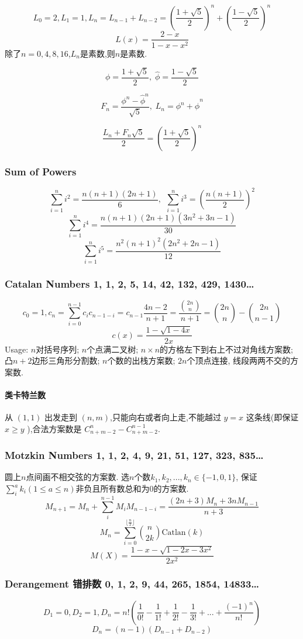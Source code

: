 \begin{small}
\[ L_0=2,L_1=1,L_n=L_{n-1}+L_{n-2}=(\frac{1+\sqrt{5}}{2})^n+(\frac{1-\sqrt{5}}{2})^n \]
\[ L(x)=\frac{2-x}{1-x-x^2} \]
除了$n=0,4,8,16$,$L_n$是素数,则$n$是素数.

$$\phi = \frac {1 + \sqrt 5} 2, \; \hat\phi = \frac {1 - \sqrt 5} 2$$

$$F_n = \frac {\phi^n - {\hat\phi} ^ n} {\sqrt 5}, \; L_n = \phi ^ n + {\hat\phi} ^ n$$

$$\frac {L_n + F_n \sqrt 5} 2 = \left( \frac {1 + \sqrt 5} 2 \right) ^ n$$

\subsubsection{Sum of Powers}
\[\sum_{i=1}^ni^2=\frac{n(n+1)(2n+1)}{6},\ \ \sum_{i=1}^ni^3=\left(\frac{n(n+1)}{2}\right)^2\]
\[\sum_{i=1}^ni^4=\frac{n(n+1)(2n+1)(3n^2+3n-1)}{30}\]
\[\sum_{i=1}^ni^5=\frac{n^2(n+1)^2(2n^2+2n-1)}{12}\]

\subsubsection{Catalan Numbers 1, 1, 2, 5, 14, 42, 132, 429, 1430\dots}
\[c_{0}=1,c_n=\sum_{i=0}^{n-1}c_ic_{n-1-i}=c_{n-1}\frac{4n-2}{n+1}=\frac{\binom{2n}{n}}{n+1}=\binom{2n}{n}-\binom{2n}{n-1}\]
\[ c(x)=\frac{1-\sqrt{1-4x}}{2x}\]
Usage: $n$对括号序列; $n$个点满二叉树; $n\times n$的方格左下到右上不过对角线方案数; 凸$n+2$边形三角形分割数; $n$个数的出栈方案数; $2n$个顶点连接, 线段两两不交的方案数.
\paragraph*{类卡特兰数}
从 $(1,1)$ 出发走到 $(n,m)$,只能向右或者向上走,不能越过 $y=x$ 这条线(即保证 $x\geq y$ ),合法方案数是 $C_{n+m-2}^{n} - C_{n+m-2}^{n-1}$.
\subsubsection{Motzkin Numbers 1, 1, 2, 4, 9, 21, 51, 127, 323, 835\dots}
圆上$n$点间画不相交弦的方案数. 选$n$个数$k_1,k_2,...,k_n\in\{-1,0,1\}$, 保证$\sum_i^ak_i(1\leq a\leq n)$非负且所有数总和为$0$的方案数. \[M_{n+1}=M_n+\sum_i^{n-1}M_iM_{n-1-i}=\frac{(2n+3)M_n+3nM_{n-1}}{n+3}\]
\[M_n=\sum_{i=0}^{\lfloor \frac{n}{2}\rfloor}\binom{n}{2k} \mathrm{Catlan}(k)\]
\[M(X)=\frac{1-x-\sqrt{1-2x-3x^2}}{2x^2}\]
\subsubsection{Derangement 错排数 0, 1, 2, 9, 44, 265, 1854, 14833\dots}
\[D_1=0,D_2=1,D_n=n!(\frac{1}{0!}-\frac{1}{1!}+\frac{1}{2!}-\frac{1}{3!}+...+\frac{(-1)^n}{n!})\]
\[D_n=(n-1)(D_{n-1}+D_{n-2})\]

\end{small}
